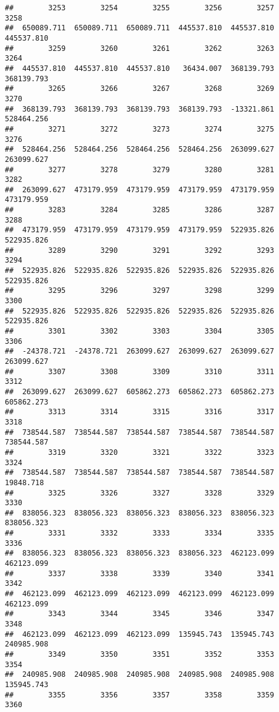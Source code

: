 \documentclass[
]{book}
\begin{document}
\begin{verbatim}
##        3253        3254        3255        3256        3257        3258 
##  650089.711  650089.711  650089.711  445537.810  445537.810  445537.810 
##        3259        3260        3261        3262        3263        3264 
##  445537.810  445537.810  445537.810   36434.007  368139.793  368139.793 
##        3265        3266        3267        3268        3269        3270 
##  368139.793  368139.793  368139.793  368139.793  -13321.861  528464.256 
##        3271        3272        3273        3274        3275        3276 
##  528464.256  528464.256  528464.256  528464.256  263099.627  263099.627 
##        3277        3278        3279        3280        3281        3282 
##  263099.627  473179.959  473179.959  473179.959  473179.959  473179.959 
##        3283        3284        3285        3286        3287        3288 
##  473179.959  473179.959  473179.959  473179.959  522935.826  522935.826 
##        3289        3290        3291        3292        3293        3294 
##  522935.826  522935.826  522935.826  522935.826  522935.826  522935.826 
##        3295        3296        3297        3298        3299        3300 
##  522935.826  522935.826  522935.826  522935.826  522935.826  522935.826 
##        3301        3302        3303        3304        3305        3306 
##  -24378.721  -24378.721  263099.627  263099.627  263099.627  263099.627 
##        3307        3308        3309        3310        3311        3312 
##  263099.627  263099.627  605862.273  605862.273  605862.273  605862.273 
##        3313        3314        3315        3316        3317        3318 
##  738544.587  738544.587  738544.587  738544.587  738544.587  738544.587 
##        3319        3320        3321        3322        3323        3324 
##  738544.587  738544.587  738544.587  738544.587  738544.587   19848.718 
##        3325        3326        3327        3328        3329        3330 
##  838056.323  838056.323  838056.323  838056.323  838056.323  838056.323 
##        3331        3332        3333        3334        3335        3336 
##  838056.323  838056.323  838056.323  838056.323  462123.099  462123.099 
##        3337        3338        3339        3340        3341        3342 
##  462123.099  462123.099  462123.099  462123.099  462123.099  462123.099 
##        3343        3344        3345        3346        3347        3348 
##  462123.099  462123.099  462123.099  135945.743  135945.743  240985.908 
##        3349        3350        3351        3352        3353        3354 
##  240985.908  240985.908  240985.908  240985.908  240985.908  135945.743 
##        3355        3356        3357        3358        3359        3360 

\end{verbatim}
\end{document}
